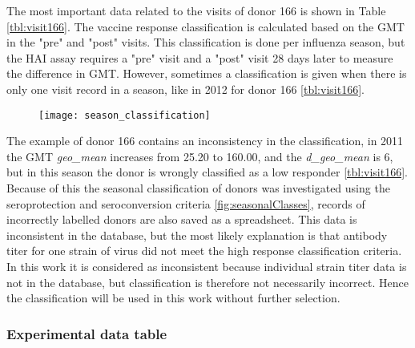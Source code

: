 The most important data related to the visits of donor 166 is shown in Table
\ref{tbl:visit166}.  The vaccine response classification is calculated based on
the GMT in the "pre" and "post" visits.  This classification is done per
influenza season, but the HAI assay requires a "pre" visit and a "post" visit
28 days later to measure the difference in GMT.  However, sometimes a
classification is given when there is only one visit record in a season, like
in 2012 for donor 166 \autoref{tbl:visit166}.

\begin{figure}[htpb]
    \texttt{[image: season\_classification]}
    \caption{}\label{fig:classInconsistent}
\end{figure}

The example of donor 166 contains an inconsistency in the classification, in
2011 the GMT \textit{geo\_mean} increases from 25.20 to 160.00, and the
\textit{d\_geo\_mean} is 6, but in this season the donor is wrongly classified
as a low responder \autoref{tbl:visit166}. Because of this the seasonal
classification of donors was investigated using the seroprotection and
seroconversion criteria \ref{fig:seasonalClasses}, records of incorrectly
labelled donors are also saved as a spreadsheet. This data is inconsistent in
the database, but the most likely explanation is that antibody titer for one
strain of virus did not meet the high response classification criteria. In this
work it is considered as inconsistent because individual strain titer data is
not in the database, but classification is therefore not necessarily incorrect.
Hence the classification will be used in this work without further selection.

\subsubsection{Experimental data table}


